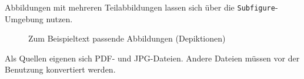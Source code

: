         Abbildungen mit mehreren Teilabbildungen lassen sich über die
        \texttt{Subfigure}-Umgebung nutzen.
        \begin{figure}
            \centering
            \hfill
            \vfill
            \caption{Zum Beispieltext passende Abbildungen (Depiktionen)}
            \label{fig:beispielDepiktionen}
        \end{figure}
        
        Als Quellen eigenen sich PDF- und JPG-Dateien. Andere Dateien müssen vor der
        Benutzung konvertiert werden.
    
    
